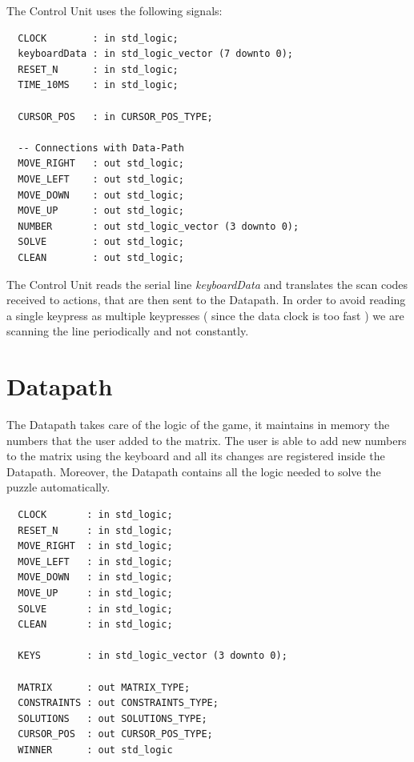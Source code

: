 \documentclass[12pt]{report}
\begin{document}
The Control Unit uses the following signals:

\begin{center}
\begin{minipage}{0.5\textwidth}
\begin{verbatim}
  CLOCK        : in std_logic;
  keyboardData : in std_logic_vector (7 downto 0);
  RESET_N      : in std_logic;
  TIME_10MS    : in std_logic;

  CURSOR_POS   : in CURSOR_POS_TYPE;

  -- Connections with Data-Path
  MOVE_RIGHT   : out std_logic;
  MOVE_LEFT    : out std_logic;
  MOVE_DOWN    : out std_logic;
  MOVE_UP      : out std_logic;
  NUMBER       : out std_logic_vector (3 downto 0);
  SOLVE        : out std_logic;
  CLEAN        : out std_logic;
\end{verbatim}
\end{minipage}
\end{center}

The Control Unit reads the serial line \textit{keyboardData} and
translates the scan codes received to actions, that are then sent to the
Datapath. In order to avoid reading a single keypress as multiple
keypresses ( since the data clock is too fast ) we are scanning the line
periodically and not constantly.

\newpage

\section*{Datapath}

The Datapath takes care of the logic of the game, it maintains in memory
the numbers that the user added to the matrix. The user is able to add new
numbers to the matrix using the keyboard and all its changes are registered
inside the Datapath. Moreover, the Datapath contains all the logic needed to
solve the puzzle automatically.

\begin{center}
\begin{minipage}{0.5\textwidth}
\begin{verbatim}
  CLOCK       : in std_logic;
  RESET_N     : in std_logic;
  MOVE_RIGHT  : in std_logic;
  MOVE_LEFT   : in std_logic;
  MOVE_DOWN   : in std_logic;
  MOVE_UP     : in std_logic;
  SOLVE       : in std_logic;
  CLEAN       : in std_logic;

  KEYS        : in std_logic_vector (3 downto 0);

  MATRIX      : out MATRIX_TYPE;
  CONSTRAINTS : out CONSTRAINTS_TYPE;
  SOLUTIONS   : out SOLUTIONS_TYPE;
  CURSOR_POS  : out CURSOR_POS_TYPE;
  WINNER      : out std_logic
\end{verbatim}
\end{minipage}
\end{center}
\end{document}

